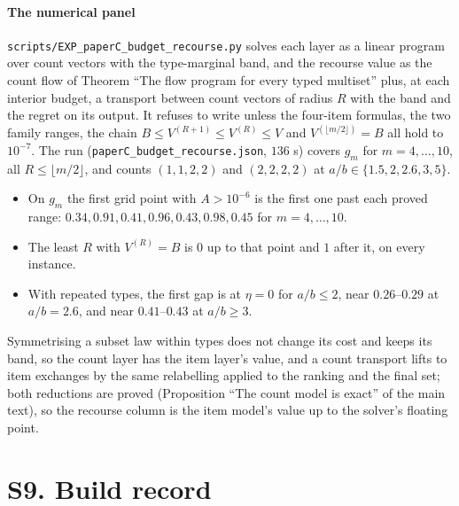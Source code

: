 \paragraph{The numerical panel} \NUM{} \texttt{scripts/EXP\_paperC\_budget\_recourse.py} solves each
layer as a linear program over count vectors with the type-marginal band, and the recourse value
as the count flow of Theorem ``The flow program for every typed multiset'' plus, at each interior
budget, a transport between count vectors of radius $R$ with the band and the regret on its
output. It refuses to write unless the four-item formulas, the two family ranges, the chain
$B\le V^{(R+1)}\le V^{(R)}\le V$ and $V^{(\lfloor m/2\rfloor)}=B$ all hold to $10^{-7}$. The run
(\texttt{paperC\_budget\_recourse.json}, $136$ s) covers $g_m$ for $m=4,\dots,10$, all
$R\le\lfloor m/2\rfloor$, and counts $(1,1,2,2)$ and $(2,2,2,2)$ at $a/b\in\{1.5,2,2.6,3,5\}$.
\begin{itemize}
\item On $g_m$ the first grid point with $A>10^{-6}$ is the first one past each proved range:
$0.34,0.91,0.41,0.96,0.43,0.98,0.45$ for $m=4,\dots,10$.
\item The least $R$ with $V^{(R)}=B$ is $0$ up to that point and $1$ after it, on every
instance.
\item With repeated types, the first gap is at $\eta=0$ for $a/b\le2$, near $0.26$--$0.29$ at
$a/b=2.6$, and near $0.41$--$0.43$ at $a/b\ge3$.
\end{itemize}
Symmetrising a subset law within types does not change its cost and keeps its band, so the
count layer has the item layer's value, and a count transport lifts to item exchanges by the same
relabelling applied to the ranking and the final set; both reductions are proved
(Proposition ``The count model is exact'' of the main text), so the recourse column is the item
model's value up to the solver's floating point.

\section{S9. Build record}

